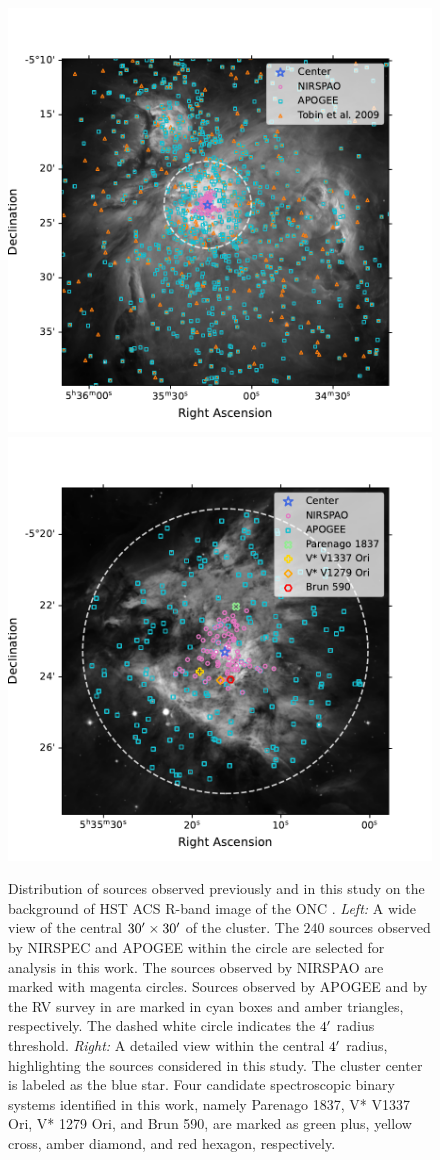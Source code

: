 \documentclass[12pt]{ucsddissertation}
\begin{document}
\begin{CJK*}{UTF8}{gbsn}
\begin{figure}[ht!]
    \centering
    \includegraphics[width=0.496\columnwidth]{figures/chapter1/Skymap_Wide.pdf}
    \includegraphics[width=0.496\columnwidth]{figures/chapter1/Skymap_Zoom.pdf}
    \caption[Spatial Distribution of Sources in the Orion Nebula Cluster]{Distribution of sources observed previously and in this study on the background of HST ACS R-band image of the ONC \citep{Robberto-2013}.  \textit{Left:} A wide view of the central $30\mbox{$^\prime$}\times30\mbox{$^\prime$}$ of the cluster. The $240$ sources observed by NIRSPEC and APOGEE within the circle are selected for analysis in this work. The sources observed by NIRSPAO are marked with magenta circles. Sources observed by APOGEE and by the RV survey in \citet{Tobin-2009} are marked in cyan boxes and amber triangles, respectively. The dashed white circle indicates the $4\mbox{$^\prime$}$ radius threshold.  \textit{Right:} A detailed view within the central $4\mbox{$^\prime$}$ radius, highlighting the sources considered in this study. The cluster center is labeled as the blue star. Four candidate spectroscopic binary systems identified in this work, namely Parenago 1837, V* V1337 Ori, V* 1279 Ori, and Brun 590, are marked as green plus, yellow cross, amber diamond, and red hexagon, respectively. }
    \label{fig:skymap}
\end{figure}


\end{CJK*}
\end{document}

